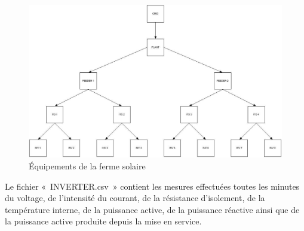 \begin{figure}[!ht]
\begin{center} \includegraphics[scale=0.5]{rapport/images/Ch51_equipements_parc.png} \end{center}
\caption{Équipements de la ferme solaire}
\end{figure}

\newpage

Le fichier « INVERTER.csv » contient les mesures effectuées toutes les minutes du voltage, de l'intensité du courant, de la résistance d’isolement, de la température interne, de la puissance active, de la puissance réactive ainsi que de la puissance active produite depuis la mise en service.

